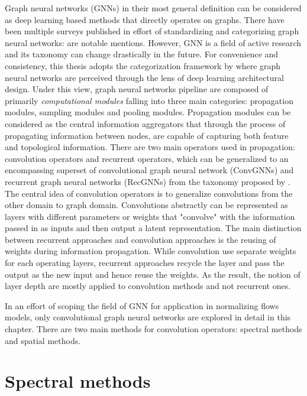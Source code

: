 Graph neural networks (GNNs) in their most general definition can be considered
as deep learning based methods that directly operates on graphs. There have been
multiple surveys published in effort of standardizing and categorizing graph
neural networks: \cite{zhangdeeplearninggraphs2020}
\cite{zhangdeeplearninggraphs2020} \cite{chamiMachineLearningGraphs2022} are
notable mentions. However, GNN is a field of active research and its taxonomy
can change drastically in the future. For convenience and consistency, this
thesis adopts the categorization framework by \cite{zhangdeeplearninggraphs2020}
where graph neural networks are perceived through the lens of deep learning
architectural design. Under this view, graph neural networks pipeline are
composed of primarily \textit{computational modules} falling into three main
categories: propagation modules, sampling modules and pooling modules.
Propagation modules can be considered as the central information aggregators
that through the process of propagating information between nodes, are capable
of capturing both feature and topological information. There are two main
operators used in propagation: convolution operators and recurrent operators,
which can be generalized to an encompassing superset of convolutional graph
neural network (ConvGNNs) and recurrent graph neural networks (RecGNNs) from the
taxonomy proposed by \cite{wuComprehensiveSurveyGraph2021}. The central idea of
convolution operators is to generalize convolutions from the other domain to
graph domain. Convolutions abstractly can be represented as layers with
different parameters or weights that "convolve" with the information passed in
as inputs and then output a latent representation. The main distinction between
recurrent approaches and convolution approaches is the reusing of weights during
information propagation. While convolution use separate weights for each
operating layers, recurrent approaches recycle the layer and pass the output as
the new input and hence reuse the weights. As the result, the notion of layer
depth are mostly applied to convolution methods and not recurrent ones.

In an effort of scoping the field of GNN for application in normalizing flows
models, only convolutional graph neural networks are explored in detail in this
chapter. There are two main methods for convolution operators: spectral methods
and spatial methods.

\section{Spectral methods}
